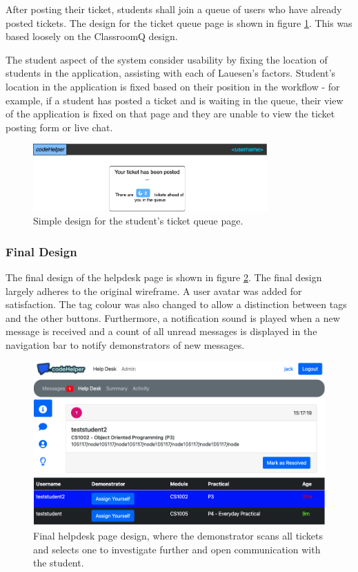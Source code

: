 After posting their ticket, students shall join a queue of users who have already posted tickets. The design for the ticket queue page is shown in figure \ref{fig:queuewire}. This was based loosely on the ClassroomQ design. 

The student aspect of the system consider usability by fixing the location of students in the application, assisting with each of Lauesen's factors. Student's location in the application is fixed based on their position in the workflow - for example, if a student has posted a ticket and is waiting in the queue, their view of the application is fixed on that page and they are unable to view the ticket posting form or live chat.

\begin{figure}[H]
    \centering
    \includegraphics[width=0.8\textwidth]{7design/images/ticketQueue.png}
        \caption{Simple design for the student's ticket queue page.}
    \label{fig:queuewire}
\end{figure}

\subsubsection{Final Design}

The final design of the helpdesk page is shown in figure \ref{fig:helpdeskfinal}. The final design largely adheres to the original wireframe. A user avatar was added for satisfaction. The tag colour was also changed to allow a distinction between tags and the other buttons. Furthermore, a notification sound is played when a new message is received and a count of all unread messages is displayed in the navigation bar to notify demonstrators of new messages. 

\begin{figure}[H]
    \centering
    \includegraphics[width=\textwidth]{7design/images/helpdesk.png}
    \caption{Final helpdesk page design, where the demonstrator scans all tickets and selects one to investigate further and open communication with the student.}
    \label{fig:helpdeskfinal}
\end{figure}

